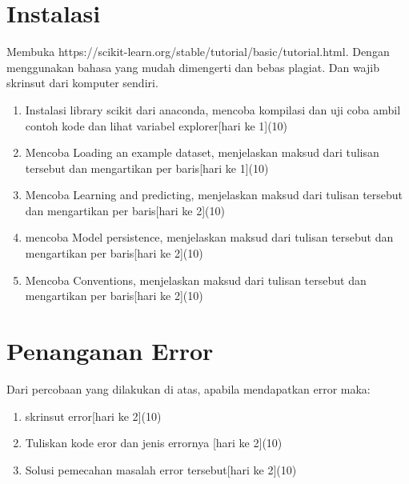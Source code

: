 \section{Instalasi}
Membuka https://scikit-learn.org/stable/tutorial/basic/tutorial.html. Dengan menggunakan bahasa yang mudah dimengerti dan bebas plagiat. 
Dan wajib skrinsut dari komputer sendiri.
\begin{enumerate}
\item
Instalasi library scikit dari anaconda, mencoba kompilasi dan uji coba ambil contoh kode dan lihat variabel explorer[hari ke 1](10)
\item
Mencoba Loading an example dataset, menjelaskan maksud dari tulisan tersebut dan mengartikan per baris[hari ke 1](10)
\item
Mencoba Learning and predicting, menjelaskan maksud dari tulisan tersebut dan mengartikan per baris[hari ke 2](10)
\item
mencoba Model persistence, menjelaskan maksud dari tulisan tersebut dan mengartikan per baris[hari ke 2](10)
\item 
Mencoba Conventions, menjelaskan maksud dari tulisan tersebut dan mengartikan per baris[hari ke 2](10)
\end{enumerate}


\section{Penanganan Error}
Dari percobaan yang dilakukan di atas, apabila mendapatkan error maka:

\begin{enumerate}
	\item
	skrinsut error[hari ke 2](10)
	\item
Tuliskan kode eror dan jenis errornya [hari ke 2](10)
	\item
Solusi pemecahan masalah error tersebut[hari ke 2](10)

\end{enumerate}

